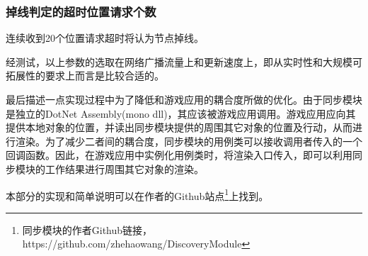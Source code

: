 \subsubsection{掉线判定的超时位置请求个数}
连续收到20个位置请求超时将认为节点掉线。
\par
经测试，以上参数的选取在网络广播流量上和更新速度上，即从实时性和大规模可拓展性的要求上而言是比较合适的。
\par
最后描述一点实现过程中为了降低和游戏应用的耦合度所做的优化。由于同步模块是独立的DotNet Assembly(mono dll)，其应该被游戏应用调用。游戏应用应向其提供本地对象的位置，并读出同步模块提供的周围其它对象的位置及行动，从而进行渲染。为了减少二者间的耦合度，同步模块的用例类可以接收调用者传入的一个回调函数。因此，在游戏应用中实例化用例类时，将渲染入口传入，即可以利用同步模块的工作结果进行周围其它对象的渲染。
\par
本部分的实现和简单说明可以在作者的Github站点\footnote{同步模块的作者Github链接，https://github.com/zhehaowang/DiscoveryModule}上找到。
